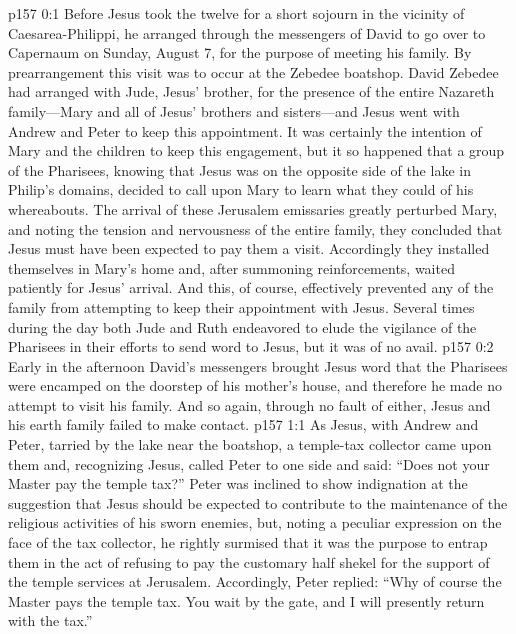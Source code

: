\author{Midwayer Commission}
\vs p157 0:1 Before Jesus took the twelve for a short sojourn in the vicinity of Caesarea\hyp{}Philippi, he arranged through the messengers of David to go over to Capernaum on Sunday, August 7, for the purpose of meeting his family. By prearrangement this visit was to occur at the Zebedee boatshop. David Zebedee had arranged with Jude, Jesus’ brother, for the presence of the entire Nazareth family---Mary and all of Jesus’ brothers and sisters---and Jesus went with Andrew and Peter to keep this appointment. It was certainly the intention of Mary and the children to keep this engagement, but it so happened that a group of the Pharisees, knowing that Jesus was on the opposite side of the lake in Philip’s domains, decided to call upon Mary to learn what they could of his whereabouts. The arrival of these Jerusalem emissaries greatly perturbed Mary, and noting the tension and nervousness of the entire family, they concluded that Jesus must have been expected to pay them a visit. Accordingly they installed themselves in Mary’s home and, after summoning reinforcements, waited patiently for Jesus’ arrival. And this, of course, effectively prevented any of the family from attempting to keep their appointment with Jesus. Several times during the day both Jude and Ruth endeavored to elude the vigilance of the Pharisees in their efforts to send word to Jesus, but it was of no avail.\plusone
\vs p157 0:2 Early in the afternoon David’s messengers brought Jesus word that the Pharisees were encamped on the doorstep of his mother’s house, and therefore he made no attempt to visit his family. And so again, through no fault of either, Jesus and his earth family failed to make contact.
\vs p157 1:1 As Jesus, with Andrew and Peter, tarried by the lake near the boatshop, a temple\hyp{}tax collector came upon them and, recognizing Jesus, called Peter to one side and said: “Does not your Master pay the temple tax?” Peter was inclined to show indignation at the suggestion that Jesus should be expected to contribute to the maintenance of the religious activities of his sworn enemies, but, noting a peculiar expression on the face of the tax collector, he rightly surmised that it was the purpose to entrap them in the act of refusing to pay the customary half shekel for the support of the temple services at Jerusalem. Accordingly, Peter replied: “Why of course the Master pays the temple tax. You wait by the gate, and I will presently return with the tax.”
